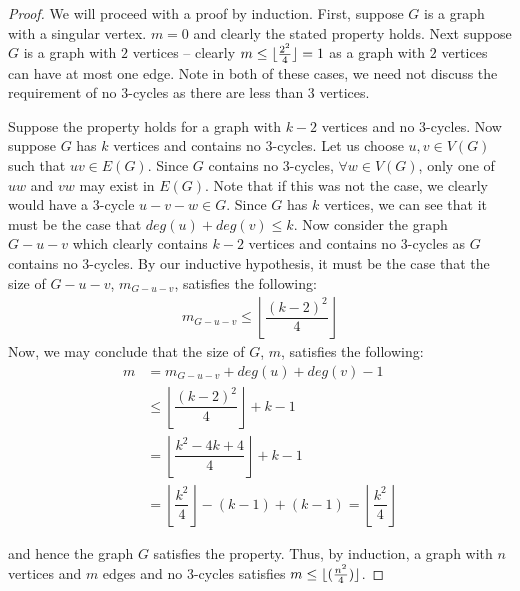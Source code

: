 \documentclass[10pt]{article}
\DeclarePairedDelimiter\floor{\lfloor}{\rfloor}
\renewcommand{\qedsymbol}{}
\begin{document}
	\begin{proof}\quad\newline
    	
        We will proceed with a proof by induction. First, suppose $G$ is a graph with a singular vertex. $m=0$ and clearly the stated property holds. Next suppose $G$ is a graph with $2$ vertices -- clearly $m \leq \floor{\frac{2^2}{4}} = 1$ as a graph with $2$ vertices can have at most one edge. Note in both of these cases, we need not discuss the requirement of no 3-cycles as there are less than 3 vertices. 
        
        Suppose the property holds for a graph with $k-2$ vertices and no $3$-cycles. Now suppose $G$ has $k$ vertices and contains no $3$-cycles. Let us choose $u,v\in V(G)$ such that $uv\in E(G)$. Since $G$ contains no $3$-cycles, $\forall w\in V(G)$, only one of $uw$ and $vw$ may exist in $E(G)$. Note that if this was not the case, we clearly would have a $3$-cycle $u-v-w\in G$. Since $G$ has $k$ vertices, we can see that it must be the case that $deg(u)+deg(v)\le k$. Now consider the graph $G-u-v$ which clearly contains $k-2$ vertices and contains no 3-cycles as $G$ contains no 3-cycles. By our inductive hypothesis, it must be the case that the size of $G-u-v$, $m_{G-u-v}$, satisfies the following: 
        \begin{align*}
        	m_{G-u-v} \le \left\lfloor\dfrac{(k-2)^2}{4}\right\rfloor
        \end{align*}
        Now, we may conclude that the size of $G$, $m$, satisfies the following: 
        \begin{align*}
        	m &= m_{G-u-v} + deg(u) +deg(v) - 1\\
            &\le \left\lfloor\dfrac{(k-2)^2}{4}\right\rfloor + k - 1\\
            &= \left\lfloor\dfrac{k^2-4k+4}{4}\right\rfloor +k - 1\\
            &= \left\lfloor\dfrac{k^2}{4}\right\rfloor -(k-1) + (k-1) = \left\lfloor\dfrac{k^2}{4}\right\rfloor
        \end{align*}
        
        and hence the graph $G$ satisfies the property. Thus, by induction, a graph with $n$ vertices and $m$ edges and no 3-cycles satisfies $m \leq \floor{(\frac{n^2}{4})}$. 
       \renewcommand{\qedsymbol}{$\blacksquare$}
        
	\end{proof}
	
	
\end{document}
